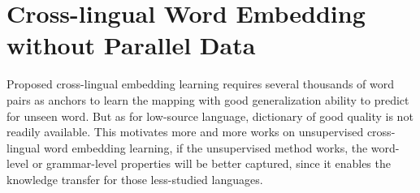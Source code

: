 \chapter{Cross-lingual Word Embedding without Parallel Data}
Proposed cross-lingual embedding learning requires several thousands of word pairs as anchors to learn the mapping with good generalization ability to predict for unseen word. But as for low-source language, dictionary of good quality is not readily available. This motivates more and more works on unsupervised cross-lingual word embedding learning, if the unsupervised method works, the word-level or grammar-level properties will be better captured, since it enables the knowledge transfer for those less-studied languages.

%
%
%
%
%
%
%
